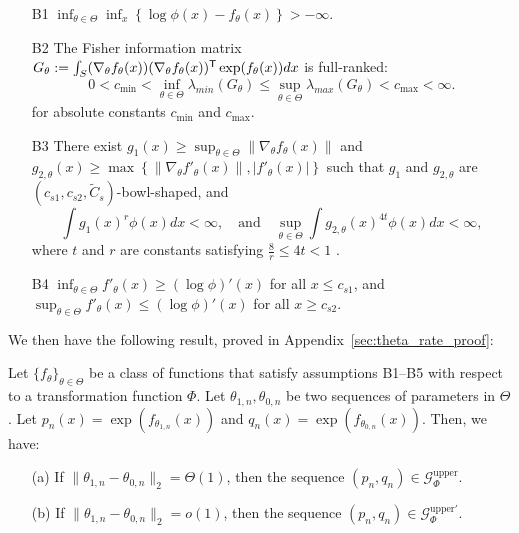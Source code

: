 \documentclass{article}
\begin{document}
\begin{enumerate}
\item[B1] $\inf_{\theta \in \Theta} \inf_{x} \left\{\log \phi(x) - f_\theta(x) \right\} > -\infty$.
\item[B2] The Fisher information matrix $G_\theta := \int_S (\nabla_{\theta} f_{\theta}(x)) 
                                    (\nabla_{\theta} f_{\theta}(x))^{\mathsf{T}} 
                      \exp( f_{\theta}(x)) dx$
is full-ranked:
   \[
 0<   c_{\min} <  \inf_{\theta \in \Theta} \lambda_{min}(G_\theta) \leq \sup_{\theta \in \Theta} \lambda_{max}(G_{\theta}) < c_{\max} < \infty.
\]
for absolute constants $c_{\min}$ and $c_{\max}$.
\item[B3] There exist $g_1(x) \geq \sup_{\theta \in \Theta} \| \nabla_\theta f_\theta(x) \|$ and $g_{2,\theta}(x) \geq \max\left\{\| \nabla_\theta f'_\theta(x) \|, |f'_\theta(x)| \right\}$  such that $g_1$ and $g_{2, \theta}$ are $(c_{s1}, c_{s2}, \tilde{C}_s)$-bowl-shaped, and
\[
   \int g_1(x)^r \phi(x) dx < \infty, \quad \text{and} \quad 
   \sup_{\theta \in \Theta} \int g_{2, \theta}(x)^{4t} \phi(x) dx < \infty,
\]
where $t$ and $r$ are constants satisfying $\frac{8}{r} \le 4t < 1$ .
\item[B4] $\inf_{\theta \in \Theta} f'_\theta(x) \geq (\log \phi)'(x) $ for all $x \leq c_{s1}$, and $\sup_{\theta \in \Theta} f'_\theta(x) \leq (\log \phi)'(x) $ for all $x \geq c_{s2}$.
\end{enumerate}

We then have the following result, proved in Appendix~\ref{sec:theta_rate_proof}:

\begin{proposition}
\label{prop:theta_rate}
Let $\{f_\theta\}_{\theta \in \Theta}$ be a class of functions that satisfy assumptions B1--B5 with respect to a transformation function $\Phi$. Let $\theta_{1,n}, \theta_{0,n}$ be two sequences of parameters in $\Theta$. Let $p_n(x) = \exp( f_{\theta_{1,n}}(x))$ and $q_n(x) = \exp( f_{\theta_{0,n}}(x))$. Then, we have:
\begin{enumerate}
\item[(a)] If $\| \theta_{1,n} - \theta_{0,n} \|_2 = \Theta(1)$, then the sequence $(p_n, q_n) \in \mathcal{G}_{\Phi}^{\textrm{upper}}$.
\item[(b)] If $\| \theta_{1,n} - \theta_{0,n} \|_2 = o(1)$, then the sequence $(p_n, q_n) \in \mathcal{G}_{\Phi}^{\textrm{upper}\prime}$.
\end{enumerate}
\end{proposition}
\end{document}
